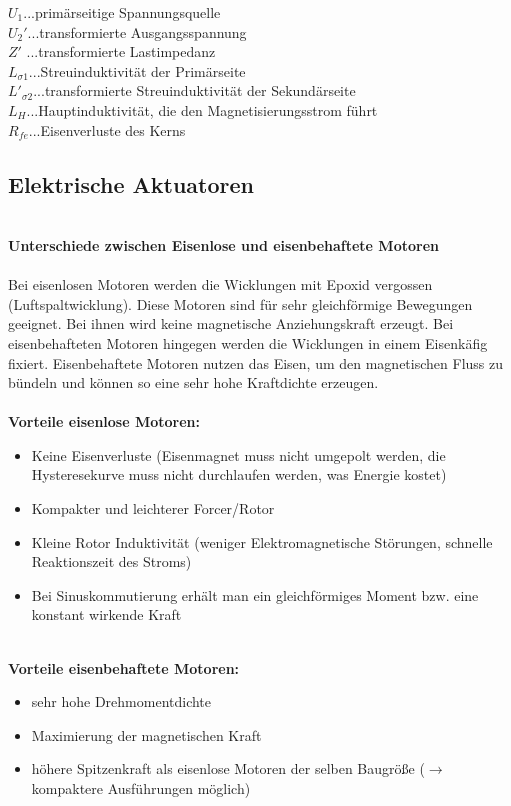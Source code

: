 					\tab[1cm] $U_{1}$\tab...\tab primärseitige Spannungsquelle \\
					\tab[1cm] $U_{2}'$\tab...\tab transformierte Ausgangsspannung \\
					\tab[1cm] $Z'$ \tab...\tab transformierte Lastimpedanz \\
					\tab[1cm] $L_{\sigma 1}$\tab...\tab Streuinduktivität der Primärseite \\
					\tab[1cm] $L'_{\sigma 2}$\tab...\tab transformierte Streuinduktivität der Sekundärseite \\
					\tab[1cm] $L_{H}$\tab...\tab Hauptinduktivität, die den Magnetisierungsstrom führt \\
					\tab[1cm] $R_{fe}$\tab...\tab Eisenverluste des Kerns \\
					
				
		\subsection{Elektrische Aktuatoren}
			\leavevmode\\
			\textbf{\large Unterschiede zwischen Eisenlose und eisenbehaftete Motoren\\\\}
			Bei eisenlosen Motoren werden die Wicklungen mit Epoxid vergossen (Luftspaltwicklung). Diese Motoren sind für sehr gleichförmige Bewegungen geeignet. Bei ihnen wird keine magnetische Anziehungskraft erzeugt.
			Bei eisenbehafteten Motoren hingegen werden die Wicklungen in einem Eisenkäfig fixiert. Eisenbehaftete Motoren nutzen das Eisen, um den magnetischen Fluss zu bündeln und können so eine sehr hohe Kraftdichte erzeugen.\\\\			
			\textbf{Vorteile eisenlose Motoren:}
			\begin{itemize}
				\item Keine Eisenverluste (Eisenmagnet muss nicht umgepolt werden, die Hysteresekurve muss nicht durchlaufen werden, was Energie kostet)
				\item Kompakter und leichterer Forcer/Rotor
				\item Kleine Rotor Induktivität (weniger Elektromagnetische Störungen, schnelle Reaktionszeit des Stroms)
				\item Bei Sinuskommutierung erhält man ein gleichförmiges Moment bzw. eine konstant wirkende Kraft
			\end{itemize}
			\leavevmode \\
			\textbf{Vorteile eisenbehaftete Motoren:}
			\begin{itemize}
				\item sehr hohe Drehmomentdichte
				\item Maximierung der magnetischen Kraft
				\item höhere Spitzenkraft als eisenlose Motoren der selben Baugröße ($ \rightarrow $ kompaktere Ausführungen möglich)
			\end{itemize}
			
